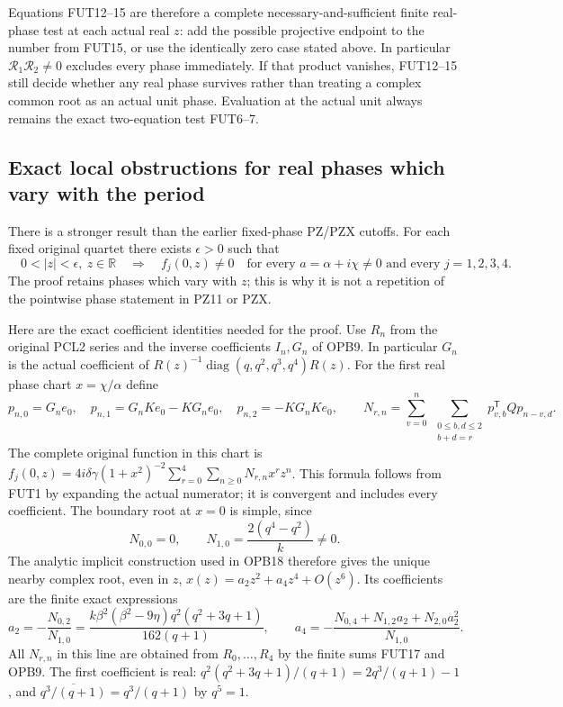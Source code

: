 Equations FUT12--15 are therefore a complete necessary-and-sufficient
finite real-phase test at each actual real $z$: add the possible
projective endpoint to the number from FUT15, or use the identically
zero case stated above. In particular $\mathscr R_1\mathscr R_2\ne0$
excludes every phase immediately. If that product vanishes, FUT12--15
still decide whether any real phase survives rather than treating a
complex common root as an actual unit phase. Evaluation at the actual
unit always remains the exact two-equation test FUT6--7.

\subsection{Exact local obstructions for real phases which vary with the period}
There is a stronger result than the earlier fixed-phase PZ/PZX cutoffs.
For each fixed original quartet there exists $\epsilon>0$ such that
\[
 \boxed{\quad
 0<|z|<\epsilon,\ z\in\mathbb R
 \quad\Longrightarrow\quad
 f_j(0,z)\ne0\quad
 \text{for every }a=\alpha+i\chi\ne0
 \text{ and every }j=1,2,3,4.
 \quad}\tag{FUT16}
\]
The proof retains phases which vary with $z$; this is why it is not a
repetition of the pointwise phase statement in PZ11 or PZX.

Here are the exact coefficient identities needed for the proof.
Use $R_n$ from the original PCL2 series and the inverse coefficients
$I_n,G_n$ of OPB9. In particular $G_n$ is the actual coefficient of
$R(z)^{-1}\operatorname{diag}(q,q^2,q^3,q^4)R(z)$.
For the first real phase chart $x=\chi/\alpha$ define
\[
 p_{n,0}=G_ne_0,\quad p_{n,1}=G_nKe_0-KG_ne_0,\quad
 p_{n,2}=-KG_nKe_0,\qquad
 N_{r,n}=\sum_{v=0}^n\ \sum_{\substack{0\le b,d\le2\\b+d=r}}
                 p_{v,b}^{\mathsf T}Qp_{n-v,d}.
 \tag{FUT17}
\]
The complete original function in this chart is
$f_j(0,z)=4i\delta\gamma(1+x^2)^{-2}
\sum_{r=0}^4\sum_{n\ge0}N_{r,n}x^rz^n$.
This formula follows from FUT1 by expanding the actual numerator;
it is convergent and includes every coefficient.
The boundary root at $x=0$ is simple, since
\[
 N_{0,0}=0,\qquad N_{1,0}=\frac{2(q^4-q^2)}k\ne0.
 \tag{FUT18}
\]
The analytic implicit construction used in OPB18 therefore gives the
unique nearby complex root, even in $z$,
$x(z)=a_2z^2+a_4z^4+O(z^6)$. Its coefficients are the finite exact
expressions
\[
 a_2=-\frac{N_{0,2}}{N_{1,0}}
 =\frac{k\beta^2(\beta^2-9\eta)q^2(q^2+3q+1)}{162(q+1)},
 \qquad
 a_4=-\frac{N_{0,4}+N_{1,2}a_2+N_{2,0}a_2^2}{N_{1,0}}.
 \tag{FUT19}
\]
All $N_{r,n}$ in this line are obtained from $R_0,\ldots,R_4$ by
the finite sums FUT17 and OPB9. The first coefficient is real:
$q^2(q^2+3q+1)/(q+1)=2q^3/(q+1)-1$, and
$\overline{q^3/(q+1)}=q^3/(q+1)$ by $q^5=1$.

